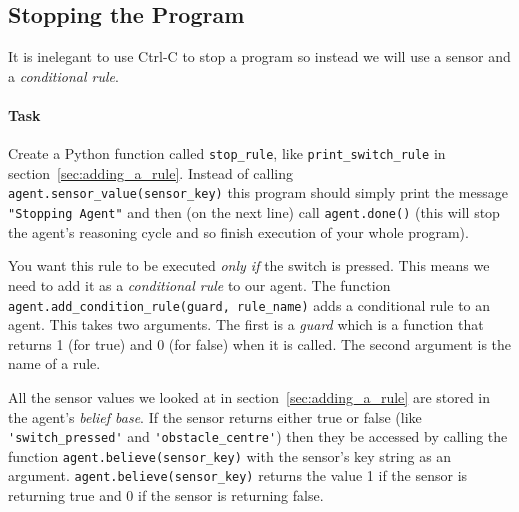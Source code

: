\documentclass[a4,12pt]{article}
\begin{document}
\subsection{Stopping the Program}

It is inelegant to use Ctrl-C to stop a program so instead we will use a sensor and a \emph{conditional rule}.

\paragraph{Task}  Create a Python function called \lstinline{stop_rule}, like \lstinline{print_switch_rule} in section~\ref{sec:adding_a_rule}.  Instead of calling \lstinline{agent.sensor_value(sensor_key)} this program should simply print the message \lstinline{"Stopping Agent"} and then (on the next line) call \lstinline{agent.done()} (this will stop the agent's reasoning cycle and so finish execution of your whole program).

You want this rule to be executed \emph{only if} the switch is pressed.  This means we need to add it as a \emph{conditional rule} to our agent.  The function \lstinline{agent.add_condition_rule(guard, rule_name)} adds a conditional rule to an agent.  This takes two arguments.  The first is a \emph{guard} which is a function that returns 1 (for true) and 0 (for false) when it is called.  The second argument is the name of a rule.

All the sensor values we looked at in section~\ref{sec:adding_a_rule} are stored in the agent's \emph{belief base}.  If the sensor returns either true or false (like \lstinline{'switch_pressed'} and \lstinline{'obstacle_centre'}) then they be accessed by calling the function \lstinline{agent.believe(sensor_key)} with the sensor's key string as an argument.  \lstinline{agent.believe(sensor_key)} returns the value 1 if the sensor is returning true and 0 if the sensor is returning false.

\begin{figure}[htbp]
  \begin{center}
    \end{center}
\end{figure}
\end{document}
